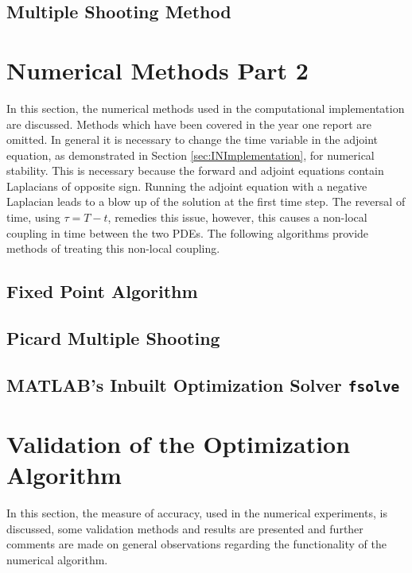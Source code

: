 \documentclass[11pt, a4paper]{article}
\theoremstyle{definition}
\begin{document}
\subsection{Multiple Shooting Method}	



	
\section{Numerical Methods Part 2} \label{sec:NumericalMethods}	
	
	In this section, the numerical methods used in the computational implementation are discussed. Methods which have been covered in the year one report are omitted.
	In general it is necessary to change the time variable in the adjoint equation, as demonstrated in Section \ref{sec:INImplementation}, for numerical stability. This is necessary because the forward and adjoint equations contain Laplacians of opposite sign. Running the adjoint equation with a negative Laplacian leads to a blow up of the solution at the first time step. The reversal of time, using $\tau = T-t$, remedies this issue, however, this causes a non-local coupling in time between the two PDEs.
	The following algorithms provide methods of treating this non-local coupling.
	
	\subsection{Fixed Point Algorithm}\label{sec:Method_SolverFP}
	
	
	
	\subsection{Picard Multiple Shooting}
	
	
	
	\subsection{{\scshape MATLAB}'s Inbuilt Optimization Solver \texttt{fsolve}} \label{sec:fsolvedescription}
	
	
	
	\section{Validation of the Optimization Algorithm} \label{sec:Validation}
	In this section, the measure of accuracy, used in the numerical experiments, is discussed, some validation methods and results are presented and further comments are made on general observations regarding the functionality of the numerical algorithm.
	
\end{document}

